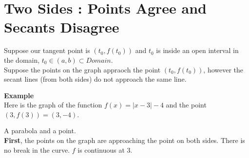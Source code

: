 \documentclass{ximera}
\begin{document}
\section{Two Sides : Points Agree and Secants Disagree}


Suppose our tangent point is $(t_0 , f(t_0))$ and $t_0$ is inside an open interval in the domain, $t_0 \in (a, b) \subset Domain$. \\


Suppose the points on the graph appraoch the point $(t_0 , f(t_0))$, however the secant lines (from both sides) do not approach the same line.



\textbf{\textcolor{blue!55!black}{Example}}  \\




Here is the graph of the function $f(x) = | x - 3 | - 4$ and the point $(3, f(3))= (3, -4)$. \\

\begin{image}
\end{image}

A parabola and a point. \\


\textbf{First}, the points on the graph are approaching the point on both sides.  There is no break in the curve. $f$ is continuous at $3$.\\
\end{document}
